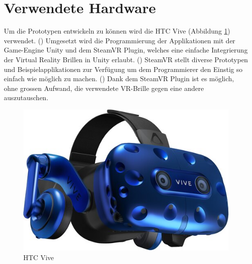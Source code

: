 \section{Verwendete Hardware}
Um die Prototypen entwickeln zu können wird die HTC Vive (Abbildung \ref{fig:htc_vive}) verwendet. (\cite{noauthor_vive_2019}) Umgesetzt wird die Programmierung der Applikationen mit der Game-Engine Unity und dem SteamVR Plugin, welches eine einfache Integrierung der Virtual Reality Brillen in Unity erlaubt. (\cite{noauthor_unity_2019}) SteamVR stellt diverse Prototypen und Beispielapplikationen zur Verfügung um dem Programmierer den Einstig so einfach wie möglich zu machen. (\cite{noauthor_steamvr_2019}) Dank dem SteamVR Plugin ist es möglich, ohne grossen Aufwand, die verwendete VR-Brille gegen eine andere auszutauschen.

\begin{figure}[h!]
	\centering
	\includegraphics[keepaspectratio,width=0.3\linewidth]{img/Vive_Pro.jpg}
	\caption{HTC Vive}
	\label{fig:htc_vive}
\end{figure}